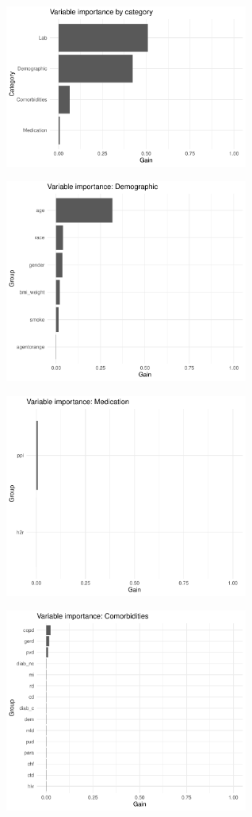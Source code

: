 \documentclass[12pt]{article}
\begin{document}
\begin{center}
\includegraphics[width=0.6\textwidth]{figures/pdp_new/vi_cat.pdf}
\end{center}
\begin{center}
\includegraphics[width=0.6\textwidth]{figures/pdp_new/vi_group_Demographic.pdf}
\end{center}
\begin{center}
\includegraphics[width=0.6\textwidth]{figures/pdp_new/vi_group_Medication.pdf}
\end{center}
\begin{center}
\includegraphics[width=0.6\textwidth]{figures/pdp_new/vi_group_Comorbidities.pdf}
\end{center}
\end{document}

